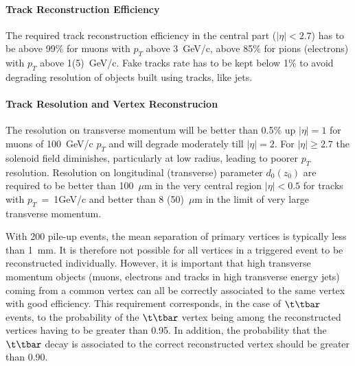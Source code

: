 \paragraph{Track Reconstruction Efficiency}
The required 
track reconstruction efficiency in the central part ($|\eta|<2.7$) has to be above 99\% for muons with 
$p_T$ above 3~GeV/c, above 85\% for pions (electrons) with 
$p_T$ above 1(5)~GeV/c.  Fake tracks rate has to be kept below 1\% to avoid degrading resolution of 
objects built using tracks, like jets.

\paragraph{Track Resolution and Vertex Reconstrucion}
The resolution on transverse momentum will be better than 0.5\% up $|\eta|=1$ for muons of 100~GeV/c 
$p_T$ and will degrade moderately till $|\eta|=2$. For $|\eta|\ge2.7$ the solenoid field diminishes, 
particularly at low radius, leading to poorer $p_T$ resolution. 
Resolution on longitudinal (transverse) parameter $d_0(z_0)$ are required to be better than 100~$\mu$m 
in the very central region $|\eta|<0.5$ for tracks with $p_T$~=~1GeV/c and better than 8 (50)~$\mu$m  
in the limit of very large transverse momentum.  
 
 With 200 pile-up events, the mean separation of primary vertices is typically less than 1~mm.
 It is therefore not possible for all vertices in a triggered event to be reconstructed individually. However, it is important that high transverse momentum objects (muons, electrons and tracks in high transverse energy jets) coming from a common vertex can all be correctly associated to the same vertex with good efficiency.
  This requirement corresponds, in the case of $\t\tbar$ events, to the probability of the $\t\tbar$  vertex being among the reconstructed vertices having to be greater than 0.95. In addition, the probability that the 
$\t\tbar$  decay is associated to the correct reconstructed vertex should be greater than 0.90.
 
